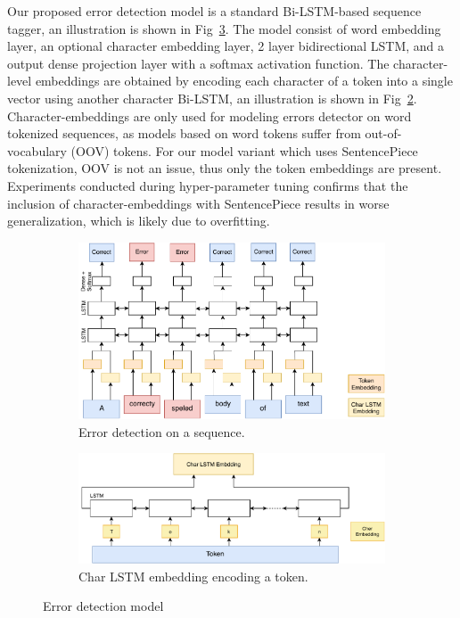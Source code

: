 Our proposed error detection model is a standard Bi-LSTM-based sequence tagger, an illustration is shown in Fig~\ref{fig:detection-model}. The model consist of word embedding layer, an optional character embedding layer, 2 layer bidirectional LSTM, and a output dense projection layer with a softmax activation function. The character-level embeddings are obtained by encoding each character of a token into a single vector using another character Bi-LSTM, an illustration is shown in Fig~\ref{fig:char-lstm-encoder}. Character-embeddings are only used for modeling errors detector on word tokenized sequences, as models based on word tokens suffer from out-of-vocabulary (OOV) tokens. For our model variant which uses SentencePiece tokenization, OOV is not an issue, thus only the token embeddings are present. Experiments conducted during hyper-parameter tuning confirms that the inclusion of character-embeddings with SentencePiece results in worse generalization, which is likely due to overfitting.

\begin{figure}
    \centering
    \begin{subfigure}{.5\textwidth}
        \centering
        \includegraphics[width=.8\linewidth]{diagrams/detection-model.pdf}
        \caption{Error detection on a sequence.}
        \label{fig:detection-model-struct}
    \end{subfigure}%
    \begin{subfigure}{.5\textwidth}
        \centering
        \includegraphics[width=.8\linewidth]{diagrams/char-lstm-encoder.pdf}
        \caption{Char LSTM embedding encoding a token.}
        \label{fig:char-lstm-encoder}
    \end{subfigure}
    \caption{Error detection model}
    \label{fig:detection-model}
\end{figure}


